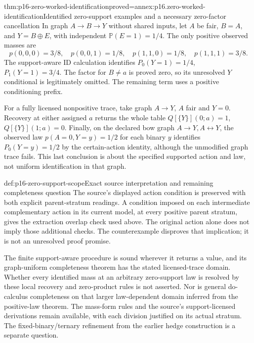 \begin{hbtheorem}{thm:p16-zero-worked-identification}{proved=annex:p16.zero-worked-identification}{Identified zero-support examples and a necessary zero-factor cancellation}
In graph \(A\to B\to Y\) without shared inputs, let \(A\)
be fair, \(B=A\), and \(Y=B\oplus E\), with independent
\(\mathbb P(E=1)=1/4\). The only positive observed masses are
\[
 p(0,0,0)=3/8,\quad p(0,0,1)=1/8,\quad
 p(1,1,0)=1/8,\quad p(1,1,1)=3/8.
\]
The support-aware ID calculation identifies
\(P_0(Y=1)=1/4\), \(P_1(Y=1)=3/4\).
The factor for \(B\ne a\) is proved zero, so its unresolved
\(Y\) conditional is legitimately omitted. The remaining term
uses a positive conditioning prefix.

For a fully licensed nonpositive trace, take graph \(A\to Y\),
\(A\) fair and \(Y=0\). Recovery at either assigned \(a\)
returns the whole table \(Q[\{Y\}](0;a)=1\),
\(Q[\{Y\}](1;a)=0\). Finally, on the declared bow graph
\(A\to Y,A\leftrightarrow Y\), the observed law
\(p(A=0,Y=y)=1/2\) for each binary \(y\) identifies
\(P_0(Y=y)=1/2\) by the certain-action identity, although the
unmodified graph trace fails. This last conclusion is about the
specified supported action and law, not uniform identification in that graph.
\end{hbtheorem}

\begin{proofboundary}{def:p16-zero-support-scope}{Exact source interpretation and remaining completeness question}
The source's displayed action condition is preserved with both explicit
parent-stratum readings. A condition imposed on each intermediate
complementary action in its current model, at every positive parent stratum,
gives the extraction overlap check used above. The original action alone
does not imply those additional checks. The counterexample disproves
that implication; it is not an unresolved proof promise.

The finite support-aware procedure is sound wherever it returns a value,
and its graph-uniform completeness theorem has the stated licensed-trace
domain. Whether every identified mass at an arbitrary zero-support law
is resolved by these local recovery and zero-product rules is not asserted.
Nor is general do-calculus completeness on that larger law-dependent
domain inferred from the positive-law theorem. The mass-form rules and
the source's support-licensed derivations remain available, with each
division justified on its actual stratum. The fixed-binary/ternary
refinement from the earlier hedge construction is a separate question.
\end{proofboundary}
